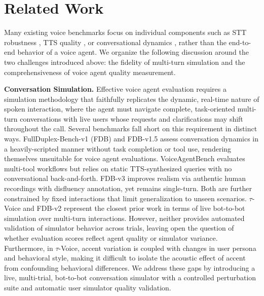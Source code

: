 
\section{Related Work}


Many existing voice benchmarks focus on individual components such as STT robustness \citep{chen2024voicebench, ao2024sd, cui2025voxeval}, TTS quality \citep{manku2026emergentttseval, huang2025sheet}, or conversational dynamics \citep{peng2025fd, aroratalking}, rather than the end-to-end behavior of a voice agent. We organize the following discussion around the two challenges introduced above: the fidelity of multi-turn simulation and the comprehensiveness of voice agent quality measurement.


\textbf{Conversation Simulation.} Effective voice agent evaluation requires a simulation methodology that faithfully replicates the dynamic, real-time nature of spoken interaction, where the agent must navigate complete, task-oriented multi-turn conversations with live users whose requests and clarifications may shift throughout the call. Several benchmarks fall short on this requirement in distinct ways. FullDuplex-Bench-v1 (FDB) and FDB-v1.5 \citep{lin2025full, lin2025fullv15} assess conversation dynamics in a heavily-scripted manner without task completion or tool use, rendering themselves unsuitable for voice agent evaluations. VoiceAgentBench \citep{jain2025voiceagentbench} evaluates multi-tool workflows but relies on static TTS-synthesized queries with no conversational back-and-forth. FDB-v3 \citep{lin2026full} improves realism via authentic human recordings with disfluency annotation, yet remains single-turn. Both are further constrained by fixed interactions that limit generalization to unseen scenarios. $\tau$-Voice \citep{ray2026tauvoicebenchmarkingfullduplexvoice} and FDB-v2 \citep{lin2026fdb_v2} represent the closest prior work in terms of live bot-to-bot simulation over multi-turn interactions. However, neither provides automated validation of simulator behavior across trials, leaving open the question of whether evaluation scores reflect agent quality or simulator variance. Furthermore, in $\tau$-Voice, accent variation is coupled with changes in user persona and behavioral style, making it difficult to isolate the acoustic effect of accent from confounding behavioral differences. We address these gaps by introducing a live, multi-trial, bot-to-bot conversation simulator with a controlled perturbation suite and automatic user simulator quality validation.


